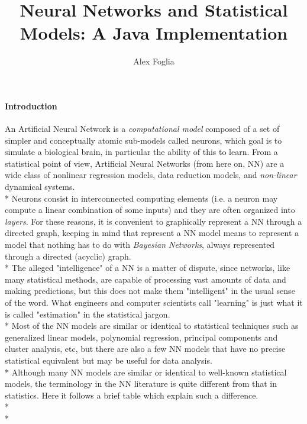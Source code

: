 \documentclass[10pt,a4paper]{article}
\author{Alex Foglia}
\title{Neural Networks and Statistical Models: A Java Implementation}
\date{}
\begin{document}
	\maketitle
	\paragraph{Introduction}
	An Artificial Neural Network is a \emph{computational model} composed of a set of simpler and conceptually atomic sub-models called neurons, which goal is to simulate a biological brain, in particular the ability of this to learn. From a statistical point of view, Artificial Neural Networks (from here on, NN) are a wide class of nonlinear regression models, data reduction models, and \emph{non-linear} dynamical systems.\\*
	Neurons consist in interconnected computing elements (i.e. a neuron may compute a linear combination of some inputs) and they are often organized into \emph{layers}. For these reasons, it is convenient to graphically represent a NN through a directed graph, keeping in mind that represent a NN model means to represent a model that nothing has to do with \emph{Bayesian Networks}, always represented through a directed (acyclic) graph.\\*
	The alleged "intelligence" of a NN is a matter of dispute, since networks, like many statistical methods, are capable of processing vast amounts of data and making predictions, but this does not make them "intelligent" in the usual sense of the word. What engineers and computer scientists call "learning" is just what it is called "estimation" in the statistical jargon.\\*
	Most of the NN models are similar or identical to statistical techniques such as generalized linear models, polynomial regression, principal components and cluster analysis, etc, but there are also a few NN models that have no precise statistical equivalent but may be useful for data analysis.\\*
	Although many NN models are similar or identical to well-known statistical models, the terminology in the NN literature is quite different from that in statistics. Here it follows a brief table which explain such a difference.
	\\*
	\\*
\end{document}
